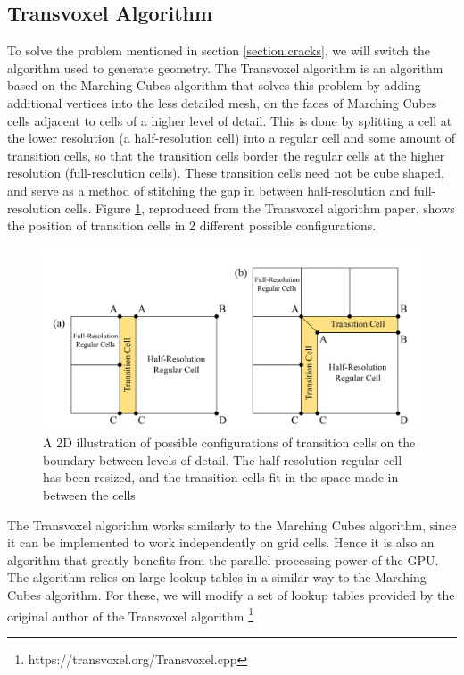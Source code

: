 \documentclass{article}
\begin{document}
\subsection{Transvoxel Algorithm}
To solve the problem mentioned in section \ref{section:cracks}, we will switch the algorithm used to generate geometry. The Transvoxel algorithm \cite{lengyel_2010} is an algorithm based on the Marching Cubes algorithm that solves this problem by adding additional vertices into the less detailed mesh, on the faces of Marching Cubes cells adjacent to cells of a higher level of detail. This is done by splitting a cell at the lower resolution (a half-resolution cell) into a regular cell and some amount of transition cells, so that the transition cells border the regular cells at the higher resolution (full-resolution cells). These transition cells need not be cube shaped, and serve as a method of stitching the gap in between half-resolution and full-resolution cells. Figure \ref{fig:transition_cells}, reproduced from the Transvoxel algorithm paper, shows the position of transition cells in 2 different possible configurations.
\begin{figure}[H]
  \includegraphics[width=\textwidth]{transition_cells}
  \caption{A 2D illustration of possible configurations of transition cells on the boundary between levels of detail. The half-resolution regular cell has been resized, and the transition cells fit in the space made in between the cells}
  \label{fig:transition_cells}
\end{figure}

The Transvoxel algorithm works similarly to the Marching Cubes algorithm, since it can be implemented to work independently on grid cells. Hence it is also an algorithm that greatly benefits from the parallel processing power of the GPU. The algorithm relies on large lookup tables in a similar way to the Marching Cubes algorithm. For these, we will modify a set of lookup tables provided by the original author of the Transvoxel algorithm \footnote{https://transvoxel.org/Transvoxel.cpp}
\end{document}
